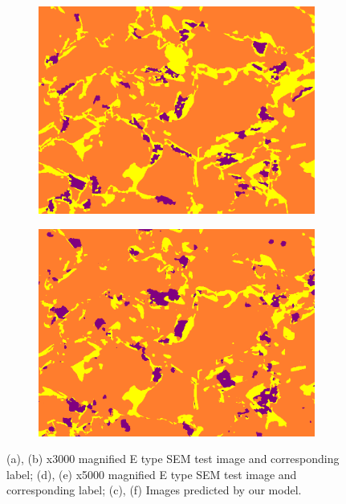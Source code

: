 \documentclass[]{article}
\begin{document}
\begin{figure}[ht]
\begin{subfigure}[b]{0.3\textwidth}
		\centering
		\includegraphics[width=\textwidth]{images/inference/SameSteelDiffMag-2-L.png}
		\caption{}
		\label{fig:samesteeldiffmag5K-label}
	\end{subfigure}
	\hfill
	\begin{subfigure}[b]{0.3\textwidth}
		\centering
		\includegraphics[width=\textwidth]{images/inference/SameSteelDiffMag-2-P.png}
		\caption{}
		\label{fig:samesteeldiffmag5K-pred}
	\end{subfigure}
	
	\caption{(a), (b) x3000 magnified E type SEM test image and corresponding label; (d), (e) x5000 magnified E type SEM test image and corresponding label; (c), (f) Images predicted by our model.}
	\label{fig:samesteeldiffmag}
\end{figure}
\end{document}
